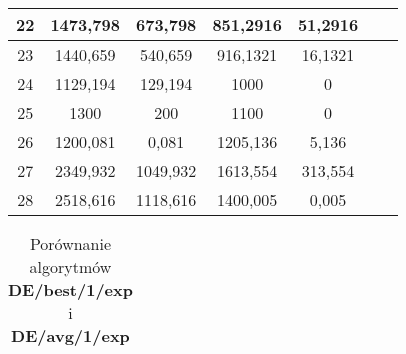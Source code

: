 \documentclass[a4paper,12pt]{article}
\theoremstyle{definition}
\begin{document}
\begin{table}[H]
\begin{tabular}{|c|c|c|c|c|c|c|}
    22    & 1473,798 & 673,798 & 851,2916 & 51,2916 \\\hline
    23    & 1440,659 & 540,659 & 916,1321 & 16,1321 \\\hline
    24    & 1129,194 & 129,194 & 1000  & 0 \\\hline
    25    & 1300  & 200   & 1100  & 0 \\\hline
    26    & 1200,081 & 0,081 & 1205,136 & 5,136 \\\hline
    27    & 2349,932 & 1049,932 & 1613,554 & 313,554 \\\hline
    28    & 2518,616 & 1118,616 & 1400,005 & 0,005 \\\hline
\end{tabular}	
\end{table}

\begin{table}[H]
\centering
\def\arraystretch{1.3}
\setlength\tabcolsep{10pt}
\caption{Porównanie algorytmów \textbf{DE/best/1/exp} i \textbf{DE/avg/1/exp}}
\vspace{8pt}
\begin{tabular}{|c|c|c|c|c|c|c|}
	

\end{tabular}
\end{table}
\end{document}
